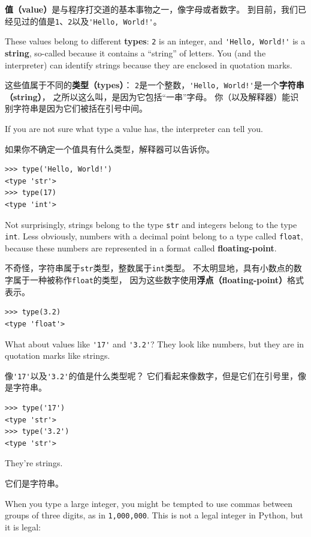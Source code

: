\documentclass[10pt]{book}
\begin{document}
\begin{CJK}{UTF8}{gbsn}
{\bf 值（value）}是与程序打交道的基本事物之一，像字母或者数字。
到目前，我们已经见过的值是{\tt 1}、{\tt 2}以及\verb"'Hello, World!'"。

These values belong to different {\bf types}:
{\tt 2} is an integer, and \verb"'Hello, World!'" is a {\bf string},
so-called because it contains a ``string'' of letters.
You (and the interpreter) can identify
strings because they are enclosed in quotation marks.

这些值属于不同的{\bf 类型（types）}：
{\tt 2}是一个整数，\verb"'Hello, World!'"是一个{\bf 字符串（string）}，
之所以这么叫，是因为它包括``一串''字母。
你（以及解释器）能识别字符串是因为它们被括在引号中间。

If you are not sure what type a value has, the interpreter can tell you.

如果你不确定一个值具有什么类型，解释器可以告诉你。

\begin{verbatim}
>>> type('Hello, World!')
<type 'str'>
>>> type(17)
<type 'int'>
\end{verbatim}
%
Not surprisingly, strings belong to the type {\tt str} and
integers belong to the type {\tt int}.  Less obviously, numbers
with a decimal point belong to a type called {\tt float},
because these numbers are represented in a
format called {\bf floating-point}.

不奇怪，字符串属于{\tt str}类型，整数属于{\tt int}类型。
不太明显地，具有小数点的数字属于一种被称作{\tt float}的类型，
因为这些数字使用{\bf 浮点（floating-point）}格式表示。

\begin{verbatim}
>>> type(3.2)
<type 'float'>
\end{verbatim}
%
What about values like \verb"'17'" and \verb"'3.2'"?
They look like numbers, but they are in quotation marks like
strings.

像\verb"'17'"以及\verb"'3.2'"的值是什么类型呢？
它们看起来像数字，但是它们在引号里，像是字符串。

\begin{verbatim}
>>> type('17')
<type 'str'>
>>> type('3.2')
<type 'str'>
\end{verbatim}
%
They're strings.

它们是字符串。

When you type a large integer, you might be tempted to use commas
between groups of three digits, as in {\tt 1,000,000}.  This is not a
legal integer in Python, but it is legal:


\end{CJK}
\end{document}
